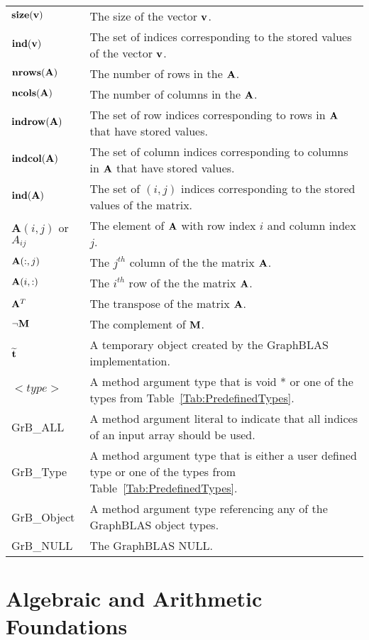 \begin{tabular}[H]{l|p{5in}}
$\mathbf{size}({\bf v})$ & The size of the vector ${\bf v}$.\\
$\mathbf{ind}({\bf v})$ & The set of indices corresponding to the stored values of the vector ${\bf v}$.\\
$\mathbf{nrows}({\bf A})$ & The number of rows in the ${\bf A}$.\\
$\mathbf{ncols}({\bf A})$ & The number of columns in the ${\bf A}$.\\
$\mathbf{indrow}({\bf A})$ & The set of row indices corresponding to rows in ${\bf A}$ that have stored values.  \\
$\mathbf{indcol}({\bf A})$ & The set of column indices corresponding to columns in ${\bf A}$ that have stored values. \\
$\mathbf{ind}({\bf A})$ & The set of $(i,j)$ indices corresponding to the stored values of the matrix. \\
$\mathbf{A}(i,j)$ or $A_{ij}$ & The element of ${\bf A}$ with row index $i$ and column index $j$.\\
${\bf A}(:,j)$ & The $j^{th}$ column of the the matrix ${\bf A}$.\\
${\bf A}(i,:)$ & The $i^{th}$ row of the the matrix ${\bf A}$.\\
${\bf A}^T$ &The transpose of the matrix ${\bf A}$. \\
$\neg{\bf M}$ & The complement of ${\bf M}$.\\
${\bf \widetilde{t}}$ & A temporary object created  by the GraphBLAS implementation. \\
$<type>$ & A method argument type that is {\sf void *} or one of the types from Table~\ref{Tab:PredefinedTypes}. \\
{\sf GrB\_ALL} & A method argument literal to indicate that all indices of an input array should be used.\\
{\sf GrB\_Type} & A method argument type that is either a user defined type or one of the  types from Table~\ref{Tab:PredefinedTypes}.\\
{\sf GrB\_Object} &  A method argument type referencing any of the GraphBLAS object types.\\
{\sf GrB\_NULL} & The GraphBLAS NULL.\\
\end{tabular}

\restoregeometry


\section{Algebraic and Arithmetic Foundations}

